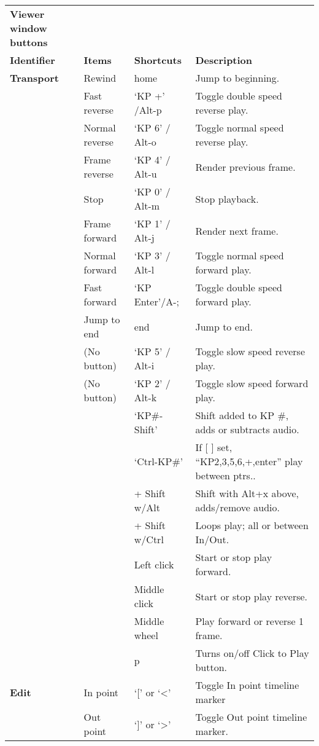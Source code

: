 \begin{longtable}[h]{>{\bfseries}p{}p{}p{}p{}}
  \toprule
  \multicolumn{4}{c}%
  {\textcolor{CinRed}{\textbf{Viewer window buttons}}} \\
  Identifier & \textbf{Items} & \textbf{Shortcuts} & \textbf{Description}\\
  \midrule
  \endhead
  \textcolor{CinBlueText}{Transport} & Rewind & home & Jump to beginning. \\
  & Fast reverse & `KP +' /Alt-p & Toggle double speed reverse play. \\
  & Normal reverse & `KP 6' / Alt-o & Toggle normal speed reverse play. \\
  & Frame reverse & `KP 4' / Alt-u & Render previous frame. \\
  & Stop & `KP 0' / Alt-m & Stop playback. \\
  & Frame forward & `KP 1' / Alt-j & Render next frame. \\
  & Normal forward & `KP 3' / Alt-l & Toggle normal speed forward play. \\
  & Fast forward & `KP Enter'/A-; & Toggle double speed forward play. \\
  & Jump to end & end & Jump to end. \\
  & (No button) & `KP 5' / Alt-i & Toggle slow speed reverse play. \\
  & (No button) & `KP 2' / Alt-k & Toggle slow speed forward play. \\
  &  & `KP\#-Shift' & Shift added to KP \#, adds or subtracts audio. \\
  &  & `Ctrl-KP\#' & If [ ] set, “KP2,3,5,6,+,enter” play between ptrs.. \\
  &  & + Shift w/Alt & Shift with Alt+x above, adds/remove audio. \\
  &  & + Shift w/Ctrl & Loops play; all or between In/Out. \\
  &  & Left click & Start or stop play forward. \\
  &  & Middle click & Start or stop play reverse. \\
  &  & Middle wheel & Play forward or reverse 1 frame. \\
  &  & p & Turns on/off Click to Play button. \\
  \midrule
  \textcolor{CinBlueText}{Edit} & In point & `[' or ‘<’ & Toggle In point timeline marker\\
  & Out point & `]' or ‘>’ & Toggle Out point timeline marker. \\

\end{longtable}
